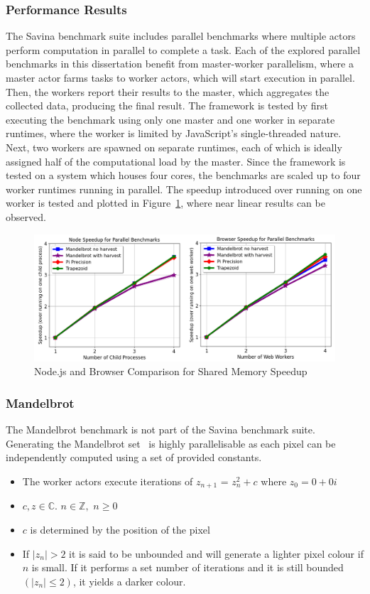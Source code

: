 \documentclass[oneside]{um-fict}
\begin{document}
\subsubsection{Performance Results}
The Savina benchmark suite includes parallel benchmarks where multiple actors perform computation in parallel to complete a task. Each of the explored parallel benchmarks in this dissertation benefit from master-worker parallelism, where a master actor farms tasks to worker actors, which will start execution in parallel. Then, the workers report their results to the master, which aggregates the collected data, producing the final result. The framework is tested by first executing the benchmark using only one master and one worker in separate runtimes, where the worker is limited by JavaScript's single-threaded nature.  Next, two workers are spawned on separate runtimes, each of which is ideally assigned half of the computational load by the master. Since the framework is tested on a system which houses four cores, the benchmarks are scaled up to four worker runtimes running in parallel. The speedup introduced over running on one worker is tested and plotted in Figure~\ref{fig:shared_memory_speedup}, where near linear results can be observed.
\begin{figure}[H]
    \begin{centering}
        \includegraphics[width=\textwidth]{resources/shared_memory_speedup.png}
        \caption{Node.js and Browser Comparison for Shared Memory Speedup}\label{fig:shared_memory_speedup}
    \end{centering}
\end{figure}
\subsubsection{Mandelbrot}
The Mandelbrot benchmark is not part of the Savina benchmark suite. Generating the Mandelbrot set~\cite{mandelbrot} is highly parallelisable as each pixel can be independently computed using a set of provided constants. 
\begin{itemize}
    \item The worker actors execute iterations of $z_{n+1}$ = $z_{n}^{2}+c$ where $z_0 = 0 + 0i$
    \item $c, z \in \mathbb{C}$. $n \in \mathbb{Z},$ $n \ge 0$
    \item $c$ is determined by the position of the pixel
    \item If $|z_n|> 2$ it is said to be unbounded and will generate a lighter pixel colour if $n$ is small. If it performs a set number of iterations and it is still bounded $(|z_n| \le 2)$, it yields a darker colour.
\end{itemize}
\end{document}
